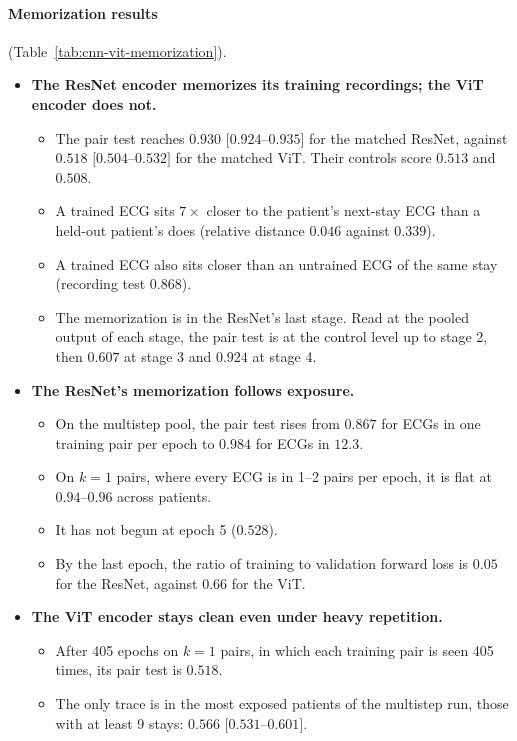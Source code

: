 \paragraph{Memorization results} (Table~\ref{tab:cnn-vit-memorization}).
\begin{itemize}
\item \textbf{The ResNet encoder memorizes its training recordings; the ViT encoder does not.}
  \begin{itemize}
  \item The pair test reaches $0.930$ $[0.924$--$0.935]$ for the matched ResNet, against $0.518$ $[0.504$--$0.532]$ for the matched ViT. Their controls score $0.513$ and $0.508$.
  \item A trained ECG sits $7\times$ closer to the patient's next-stay ECG than a held-out patient's does (relative distance $0.046$ against $0.339$).
  \item A trained ECG also sits closer than an untrained ECG of the same stay (recording test $0.868$).
  \item The memorization is in the ResNet's last stage. Read at the pooled output of each stage, the pair test is at the control level up to stage 2, then $0.607$ at stage 3 and $0.924$ at stage 4.
  \end{itemize}
\item \textbf{The ResNet's memorization follows exposure.}
  \begin{itemize}
  \item On the multistep pool, the pair test rises from $0.867$ for ECGs in one training pair per epoch to $0.984$ for ECGs in $12.3$.
  \item On $k=1$ pairs, where every ECG is in 1--2 pairs per epoch, it is flat at $0.94$--$0.96$ across patients.
  \item It has not begun at epoch 5 ($0.528$).
  \item By the last epoch, the ratio of training to validation forward loss is $0.05$ for the ResNet, against $0.66$ for the ViT.
  \end{itemize}
\item \textbf{The ViT encoder stays clean even under heavy repetition.}
  \begin{itemize}
  \item After 405 epochs on $k=1$ pairs, in which each training pair is seen 405 times, its pair test is $0.518$.
  \item The only trace is in the most exposed patients of the multistep run, those with at least 9 stays: $0.566$ $[0.531$--$0.601]$.

\end{itemize}
\end{itemize}
